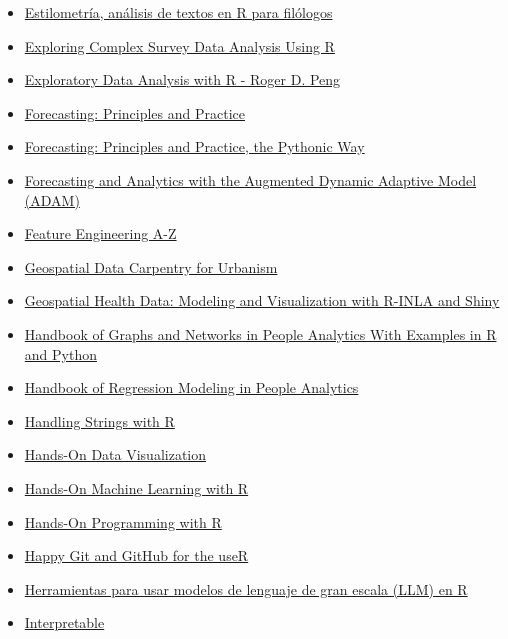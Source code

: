 \documentclass[
  letterpaper,
  DIV=11,
  numbers=noendperiod]{scrartcl}
\begin{document}
\begin{itemize}
  \href{https://www.uv.es/ayala/docencia/nmr/nmr13.pdf}{Estadística
  básica}
\item
  \href{http://www.aic.uva.es/cuentapalabras/presentacion.html}{Estilometría,
  análisis de textos en R para filólogos}
\item
  \href{https://tidy-survey-r.github.io/tidy-survey-book/}{Exploring
  Complex Survey Data Analysis Using R}
\item
  \href{https://bookdown.org/rdpeng/exdata/}{Exploratory Data Analysis
  with R - Roger D. Peng}
\item
  \href{https://otexts.com/fpp3/}{Forecasting: Principles and Practice}
\item
  \href{https://otexts.com/fpppy/}{Forecasting: Principles and Practice,
  the Pythonic Way}
\item
  \href{https://openforecast.org/adam/}{Forecasting and Analytics with
  the Augmented Dynamic Adaptive Model (ADAM)}
\item
  \href{https://feaz-book.com/}{Feature Engineering A-Z}
\item
  \href{https://carpentries-incubator.github.io/r-geospatial-urban/}{Geospatial
  Data Carpentry for Urbanism}
\item
  \href{http://www.paulamoraga.com/book-geospatial/}{Geospatial Health
  Data: Modeling and Visualization with R-INLA and Shiny}
\item
  \href{https://ona-book.org/}{Handbook of Graphs and Networks in People
  Analytics With Examples in R and Python}
\item
  \href{https://peopleanalytics-regression-book.org/}{Handbook of
  Regression Modeling in People Analytics}
\item
  \href{http://www.gastonsanchez.com/r4strings/}{Handling Strings with
  R}
\item
  \href{https://handsondataviz.org/}{Hands-On Data Visualization}
\item
  \href{https://bradleyboehmke.github.io/HOML/}{Hands-On Machine
  Learning with R}
\item
  \href{https://rstudio-education.github.io/hopr/}{Hands-On Programming
  with R}
\item
  \href{https://happygitwithr.com/}{Happy Git and GitHub for the useR}
\item
  \href{https://luisdva.github.io/llmsr-book/es/index.es.html}{Herramientas
  para usar modelos de lenguaje de gran escala (LLM) en R}
\item
  \href{https://christophm.github.io/interpretable-ml-book/}{Interpretable
}
\end{itemize}
\end{document}
